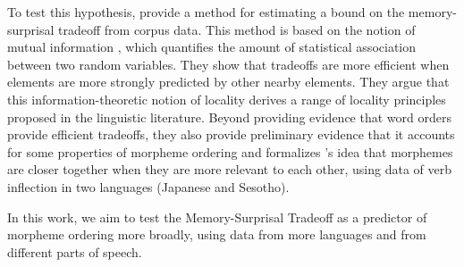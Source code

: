 \documentclass[11pt,letterpaper]{article}
\newcommand{\citep}{\parencite}
\newcommand{\citet}{\Textcite}
\begin{document}
To test this hypothesis, \citet{Hahn2020modeling} provide a method for estimating a bound on the memory-surprisal tradeoff from corpus data.
This method is based on the notion of mutual information \citep{cover2006elements}, which quantifies the amount of statistical association between two random variables.
They show that tradeoffs are more efficient when elements are more strongly predicted by other nearby elements.
They argue that this information-theoretic notion of locality derives a range of locality principles proposed in the linguistic literature.
Beyond providing evidence that word orders provide efficient tradeoffs, they also provide preliminary evidence that it accounts for some properties of morpheme ordering and formalizes \cite{bybee-morphology-1985}'s idea that morphemes are closer together when they are more relevant to each other, using data of verb inflection in two languages (Japanese and Sesotho).

In this work, we aim to test the Memory-Surprisal Tradeoff as a predictor of morpheme ordering more broadly, using data from more languages and from different parts of speech.
\end{document}
